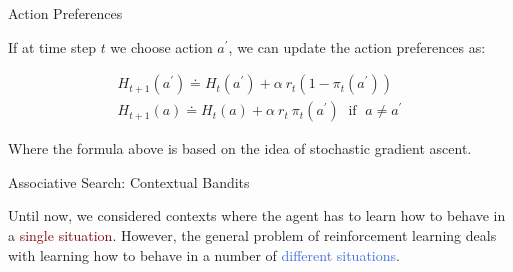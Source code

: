 \documentclass{beamer}
\begin{document}






\begin{frame}{Action Preferences}

If at time step $t$ we choose action $a^{\prime}$, we can update the action preferences as:

\begin{align*}
H_{t+1}(a^{\prime}) \doteq H_t(a^{\prime}) + \alpha \: r_t (1 - \pi_t(a^{\prime}))\\
H_{t+1}(a) \doteq H_t(a) + \alpha \: r_t \: \pi_t(a^{\prime}) \; \text{ if } \; a \neq a^{\prime}
\end{align*}

\vspace{2mm}

Where the formula above is based on the idea of stochastic gradient ascent.


\end{frame}

\begin{frame}{Associative Search: Contextual Bandits}

Until now, we considered contexts where the agent has to learn how to behave in a \textcolor{Maroon}{single situation}.
However, the general problem of reinforcement learning deals with learning how to behave in a number of \textcolor{RoyalBlue}{different situations}.

\end{frame}
\end{document}
